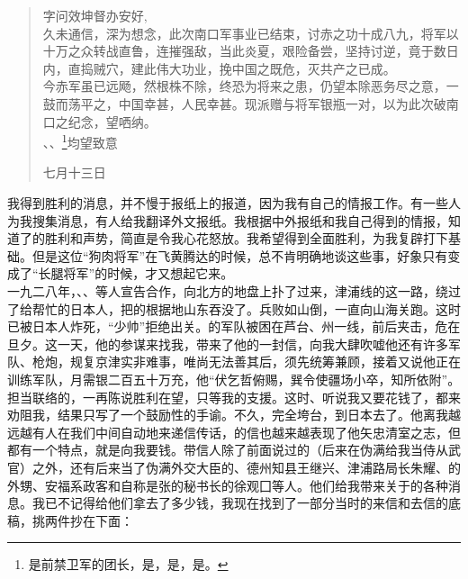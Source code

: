 \begin{quote}
	字问效坤督办安好,\\

久未通信，深为想念，此次南口军事业已结束，讨赤之功十成八九，将军以十万之众转战直鲁，连摧强敌，当此炎夏，艰险备尝，坚持讨逆，竟于数日内，直捣贼穴，建此伟大功业，挽中国之既危，灭共产之已成。\\

今赤军虽已远飏，然根株不除，终恐为将来之患，仍望本除恶务尽之意，一鼓而荡平之，中国幸甚，人民幸甚。现派赠与将军银瓶一对，以为此次破南口之纪念，望哂纳。\\

、、\footnote{是前禁卫军的团长，是，是，是。}均望致意\\

\begin{flushright}
	七月十三日\\
\end{flushright}
\end{quote}

我得到胜利的消息，并不慢于报纸上的报道，因为我有自己的情报工作。有一些人为我搜集消息，有人给我翻译外文报纸。我根据中外报纸和我自己得到的情报，知道了的胜利和声势，简直是令我心花怒放。我希望得到全面胜利，为我复辟打下基础。但是这位“狗肉将军”在飞黄腾达的时候，总不肯明确地谈这些事，好象只有变成了“长腿将军”的时候，才又想起它来。\\

一九二八年，、、等人宣告合作，向北方的地盘上扑了过来，津浦线的这一路，绕过了给帮忙的日本人，把的根据地山东吞没了。兵败如山倒，一直向山海关跑。这时已被日本人炸死，“少帅”拒绝出关。的军队被困在芦台、州一线，前后夹击，危在旦夕。这一天，他的参谋来找我，带来了他的一封信，向我大肆吹嘘他还有许多军队、枪炮，规复京津实非难事，唯尚无法善其后，须先统筹兼顾，接着又说他正在训练军队，月需银二百五十万充，他“伏乞哲俯赐，巽令使疆场小卒，知所依附”。担当联络的，一再陈说胜利在望，只等我的支援。这时、听说我又要花钱了，都来劝阻我，结果只写了一个鼓励性的手谕。不久，完全垮台，到日本去了。他离我越远越有人在我们中间自动地来递信传话，的信也越来越表现了他矢忠清室之志，但都有一个特点，就是向我要钱。带信人除了前面说过的（后来在伪满给我当侍从武官）之外，还有后来当了伪满外交大臣的、德州知县王继兴、津浦路局长朱耀、的外甥、安福系政客和自称是张的秘书长的徐观囗等人。他们给我带来关于的各种消息。我已不记得给他们拿去了多少钱，我现在找到了一部分当时的来信和去信的底稿，挑两件抄在下面：\\

